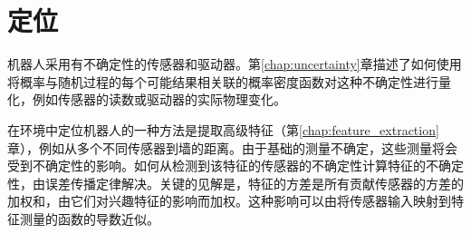 \chapter{定位}
\label{chap:localization}


机器人采用有不确定性的传感器和驱动器。第\ref{chap:uncertainty}章描述了如何使用将概率与随机过程的每个可能结果相关联的概率密度函数对这种不确定性进行量化，例如传感器的读数或驱动器的实际物理变化。



在环境中定位机器人的一种方法是提取高级特征（第\ref{chap:feature_extraction}章），例如从多个不同传感器到墙的距离。由于基础的测量不确定，这些测量将会受到不确定性的影响。如何从检测到该特征的传感器的不确定性计算特征的不确定性，由误差传播定律解决。关键的见解是，特征的方差是所有贡献传感器的方差的加权和，由它们对兴趣特征的影响而加权。这种影响可以由将传感器输入映射到特征测量的函数的导数近似。


